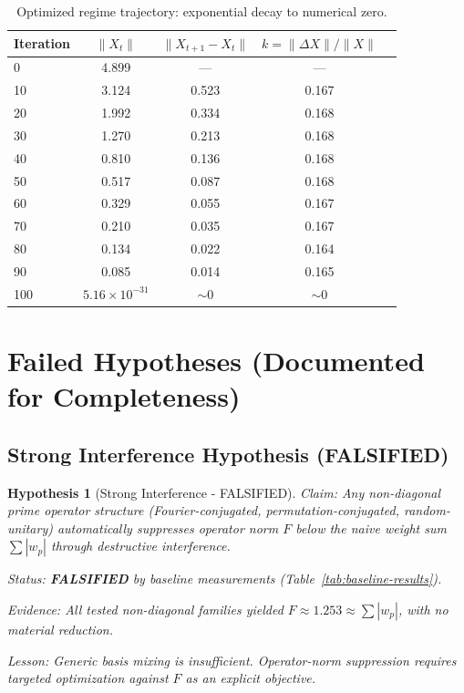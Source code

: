 \documentclass[11pt,a4paper]{article}
\newtheorem{hypothesis}{Hypothesis}
\begin{document}
\begin{table}[h]
\centering
\small
\begin{tabular}{lcccc}
\toprule
\textbf{Iteration} & \textbf{\(\|X_t\|\)} & \textbf{\(\|X_{t+1} - X_t\|\)} & \textbf{\(k = \|\Delta X\| / \|X\|\)} \\
\midrule
0 & 4.899 & --- & --- \\
10 & 3.124 & 0.523 & 0.167 \\
20 & 1.992 & 0.334 & 0.168 \\
30 & 1.270 & 0.213 & 0.168 \\
40 & 0.810 & 0.136 & 0.168 \\
50 & 0.517 & 0.087 & 0.168 \\
60 & 0.329 & 0.055 & 0.167 \\
70 & 0.210 & 0.035 & 0.167 \\
80 & 0.134 & 0.022 & 0.164 \\
90 & 0.085 & 0.014 & 0.165 \\
100 & \(5.16 \times 10^{-31}\) & \(\sim 0\) & \(\sim 0\) \\
\bottomrule
\end{tabular}
\caption{Optimized regime trajectory: exponential decay to numerical zero.}
\end{table}

\section{Failed Hypotheses (Documented for Completeness)}

\subsection{Strong Interference Hypothesis (FALSIFIED)}

\begin{hypothesis}[Strong Interference - FALSIFIED]
\emph{Claim}: Any non-diagonal prime operator structure (Fourier-conjugated, permutation-conjugated, random-unitary) automatically suppresses operator norm \(F\) below the naive weight sum \(\sum |w_p|\) through destructive interference.

\emph{Status}: \textbf{FALSIFIED} by baseline measurements (Table~\ref{tab:baseline-results}).

\emph{Evidence}: All tested non-diagonal families yielded \(F \approx 1.253 \approx \sum |w_p|\), with no material reduction.

\emph{Lesson}: Generic basis mixing is insufficient. Operator-norm suppression requires targeted optimization against \(F\) as an explicit objective.
\end{hypothesis}
\end{document}
